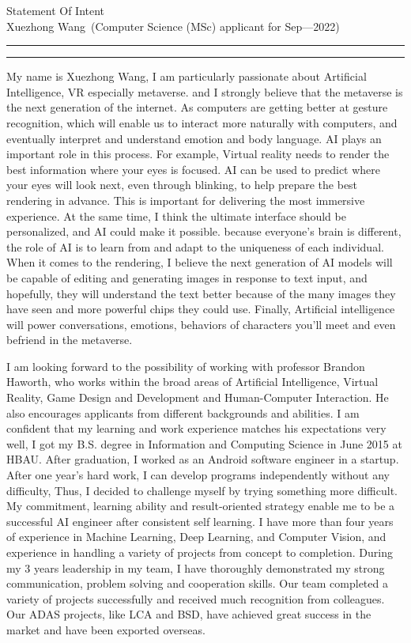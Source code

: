 \documentclass[12pt]{article}
\newcommand{\soptitle}{Statement Of Intent}
\newcommand{\yourname}{Xuezhong Wang}
\begin{document}
\begin{center}\LARGE\soptitle\\
\large \yourname\ (Computer Science (MSc) applicant for Sep---2022)
\end{center}

\hrule
\vspace{1pt}
\hrule height 1pt

\sffamily
\mdseries

\bigskip


My name is Xuezhong Wang, I am particularly passionate about Artificial Intelligence, VR especially metaverse. and I strongly believe that the metaverse is the next generation of the internet. As computers are getting better at gesture recognition, which will enable us to interact more naturally with computers, and eventually interpret and understand emotion and body language. AI plays an important role in this process. For example, Virtual reality needs to render the best information where your eyes is focused. AI can be used to predict where your eyes will look next, even through blinking, to help prepare the best rendering in advance. This is important for delivering the most immersive experience. At the same time, I think the ultimate interface should be personalized, and AI could make it possible. because everyone’s brain is different, the role of AI is to learn from and adapt to the uniqueness of each individual. When it comes to the rendering, I believe the next generation of AI models will be capable of editing and generating images in response to text input, and hopefully, they will understand the text better because of the many images they have seen and more powerful chips they could use. Finally, Artificial intelligence will power conversations, emotions, behaviors of characters you'll meet and even befriend in the metaverse.

\bigskip

I am looking forward to the possibility of working with professor Brandon Haworth, who works within the broad areas of Artificial Intelligence, Virtual Reality, Game Design and Development and Human-Computer Interaction. He also encourages applicants from different backgrounds and abilities. I am confident that my learning and work experience matches his expectations very well, I got my B.S. degree in Information and Computing Science in June 2015 at HBAU. After graduation, I worked as an Android software engineer in a startup. After one year's hard work, I can develop programs independently without any difficulty, Thus, I decided to challenge myself by trying something more difficult. My commitment, learning ability and result-oriented strategy enable me to be a successful AI engineer after consistent self learning. I have more than four years of experience in Machine Learning, Deep Learning, and Computer Vision, and experience in handling a variety of projects from concept to completion. During my 3 years leadership in my team, I have thoroughly demonstrated my strong communication, problem solving and cooperation skills. Our team completed a variety of projects successfully and received much recognition from colleagues. Our ADAS projects, like LCA and BSD, have achieved great success in the market and have been exported overseas.
\end{document}
